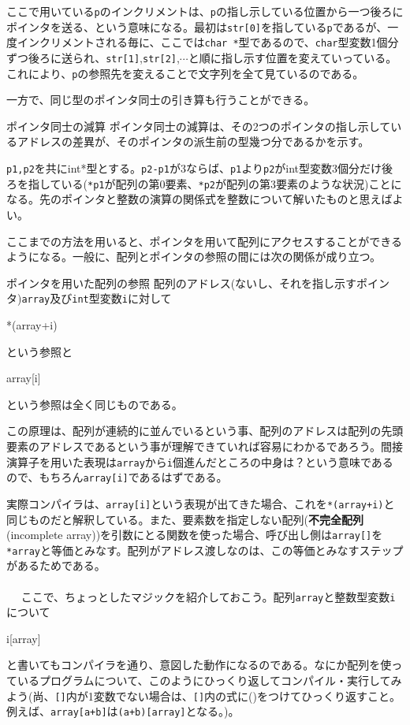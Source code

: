 ここで用いている\verb|p|のインクリメントは、\verb|p|の指し示している位置から一つ後ろにポインタを送る、という意味になる。最初は\verb|str[0]|を指している\verb|p|であるが、一度インクリメントされる毎に、ここでは\verb|char *|型であるので、\verb|char|型変数1個分ずつ後ろに送られ、\verb|str[1]|,\verb|str[2]|,$\cdots$と順に指し示す位置を変えていっている。これにより、\verb|p|の参照先を変えることで文字列を全て見ているのである。

一方で、同じ型のポインタ同士の引き算も行うことができる。
\begin{itembox}[l]{ポインタ同士の減算}
ポインタ同士の減算は、その2つのポインタの指し示しているアドレスの差異が、そのポインタの派生前の型幾つ分であるかを示す。
\end{itembox}

\verb|p1,p2|を共にint*型とする。\verb|p2-p1|が3ならば、\verb|p1|より\verb|p2|がint型変数3個分だけ後ろを指している(\verb|*p1|が配列の第0要素、\verb|*p2|が配列の第3要素のような状況)ことになる。先のポインタと整数の演算の関係式を整数について解いたものと思えばよい。

ここまでの方法を用いると、ポインタを用いて配列にアクセスすることができるようになる。一般に、配列とポインタの参照の間には次の関係が成り立つ。
\begin{itembox}[l]{ポインタを用いた配列の参照}
配列のアドレス(ないし、それを指し示すポインタ)\verb|array|及び\verb|int|型変数\verb|i|に対して
\begin{code}
*(array+i)
\end{code}
という参照と
\begin{code}
array[i]
\end{code}
という参照は全く同じものである。
\end{itembox}

この原理は、配列が連続的に並んでいるという事、配列のアドレスは配列の先頭要素のアドレスであるという事が理解できていれば容易にわかるであろう。間接演算子を用いた表現は\verb|array|から\verb|i|個進んだところの中身は？という意味であるので、もちろん\verb|array[i]|であるはずである。

実際コンパイラは、\verb|array[i]|という表現が出てきた場合、これを\verb|*(array+i)|と同じものだと解釈している。また、要素数を指定しない配列(\textbf{不完全配列}(incomplete array))を引数にとる関数を使った場合、呼び出し側は\verb|array[]|を\verb|*array|と等価とみなす。配列がアドレス渡しなのは、この等価とみなすステップがあるためである。
\\ \\　
ここで、ちょっとしたマジックを紹介しておこう。配列\verb|array|と整数型変数\verb|i|について
\begin{code}
i[array]
\end{code}
と書いてもコンパイラを通り、意図した動作になるのである。なにか配列を使っているプログラムについて、このようにひっくり返してコンパイル・実行してみよう(尚、\verb|[]|内が1変数でない場合は、\verb|[]|内の式に()をつけてひっくり返すこと。例えば、\verb|array[a+b]|は\verb|(a+b)[array]|となる。)。

